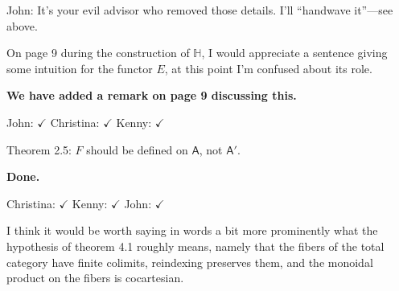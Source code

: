 \documentclass[reqno]{amsart}
\def\chris{\color{purple} Christina: }
\def\john{\color{red} John: }
\def\kenny{\color{blue} Kenny: }
\begin{document}
\begin{enumerate}
{{\john It's your evil advisor who removed those details.   I'll ``handwave it''---see above.}
\fi

\item On page 9 during the construction of $\mathbb{H}$, I would appreciate a sentence giving some intuition for the functor $E$, at this point I’m confused about  its  role.

{\bf  We have added a remark on page 9 discussing this.} 

{\john $\checkmark$} {\chris $\checkmark$} {\kenny $\checkmark$}

\iffalse
{\color{blue}{Kenny: We don't have any examples where $E$ is not an identity, but in my mind it's a functor that possibly modifies decorations, e.g. 
$F(a)$ is a category of graph structures on $a$, and $E(F(a))$ could be something like a category of possibly labeled graph structures on $a$, if 
that 
makes sense. Something potentially different than \emph{just} a graph structure on $a$.}}

{\chris Right! We can perhaps add a sentence to this end, saying that although we only use E as an identity, someone could need to change 
decorations 
for some application?}

{\kenny Sure, maybe sometime before the official statement of the Theorem when we're describing how the double functor $\mathbb{H}$ is defined?}

{\chris Sounds good to me!}

{\kenny I've added a long run-on sentence beneath the square on page 9 trying to say more about the functors $H$ and $E$ from an intuitive standpoint. Edit at will.}

{\john I edited it --- take a looks, folks and see if you're happy. I'm gonna give this one my check mark.  I actually think the referee's implicit point is right: it'd be more natural in some ways to require $E$ to be the identity, so we'd be working in the 2-category of categories over $\mathsf{Cat}$ and lax maps between these.  But I think we can stick with what we've got,
which is more general.}

{\kenny Looks good to me.}
\fi

\item Theorem 2.5: $F$ should be defined on $\mathsf{A}$, not $\mathsf{A}'$.

{\bf Done.}

 {\chris $\checkmark$} {\kenny $\checkmark$} {\john $\checkmark$}

\item I think it would be worth saying in words a bit more prominently what the hypothesis of theorem 4.1 roughly means, namely that the fibers of 
the total 
category have finite colimits, reindexing preserves them, and the monoidal product on the fibers is cocartesian.

}
\end{enumerate}
\end{document}
